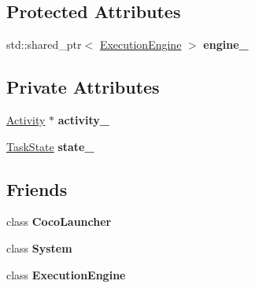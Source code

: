 \subsection*{Protected Attributes}
\begin{DoxyCompactItemize}
\item 
\hypertarget{classcoco_1_1_task_context_a7f6706f1339e8c6e8972c3c9244d5efe}{}std\+::shared\+\_\+ptr$<$ \hyperlink{classcoco_1_1_execution_engine}{Execution\+Engine} $>$ {\bfseries engine\+\_\+}\label{classcoco_1_1_task_context_a7f6706f1339e8c6e8972c3c9244d5efe}

\end{DoxyCompactItemize}
\subsection*{Private Attributes}
\begin{DoxyCompactItemize}
\item 
\hypertarget{classcoco_1_1_task_context_a3e64c0ed592191c264ccb5705e17dfcc}{}\hyperlink{classcoco_1_1_activity}{Activity} $\ast$ {\bfseries activity\+\_\+}\label{classcoco_1_1_task_context_a3e64c0ed592191c264ccb5705e17dfcc}

\item 
\hypertarget{classcoco_1_1_task_context_a47d34de836289ab6a137c8e0d584bcc0}{}\hyperlink{namespacecoco_afec53814046619bac93c2077706a6bd1}{Task\+State} {\bfseries state\+\_\+}\label{classcoco_1_1_task_context_a47d34de836289ab6a137c8e0d584bcc0}

\end{DoxyCompactItemize}
\subsection*{Friends}
\begin{DoxyCompactItemize}
\item 
\hypertarget{classcoco_1_1_task_context_ab80f178dab101a5299f5ebd3d78bef93}{}class {\bfseries Coco\+Launcher}\label{classcoco_1_1_task_context_ab80f178dab101a5299f5ebd3d78bef93}

\item 
\hypertarget{classcoco_1_1_task_context_af18a9ee98e70982bfe2975391d7221a5}{}class {\bfseries System}\label{classcoco_1_1_task_context_af18a9ee98e70982bfe2975391d7221a5}

\item 
\hypertarget{classcoco_1_1_task_context_a9b68196ad6ed6fa11eb4454434b39bb5}{}class {\bfseries Execution\+Engine}\label{classcoco_1_1_task_context_a9b68196ad6ed6fa11eb4454434b39bb5}

\end{DoxyCompactItemize}


